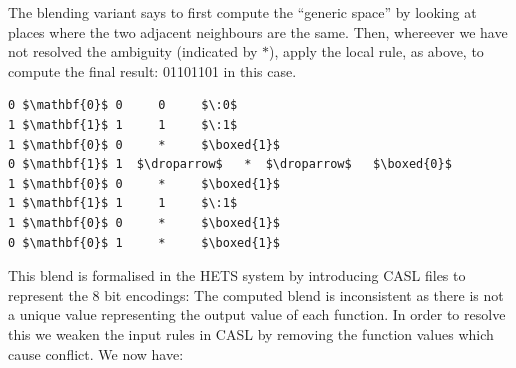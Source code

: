 \documentclass{AISB2008}
\makeatletter
\renewcommand{\boxed}[1]{\text{\fboxsep=.2em\fbox{\m@th$\displaystyle#1$}}}
\newcommand{\droparrow}{%
  \mathchoice{\raisebox{-4pt}{$\displaystyle\mapsto$}}
             {\raisebox{-4pt}{$\mapsto$}}
             {\raisebox{-2pt}{$\scriptstyle\mapsto$}}
             {\raisebox{-2pt}{$\scriptscriptstyle\mapsto$}}}
\makeatother
\begin{document}

The blending variant says to first compute the ``generic space'' by looking at places where the two adjacent neighbours are the same. Then, whereever we have not resolved the ambiguity (indicated by $\ast$), apply the local rule, as above, to compute the final result: 01101101 in this case.

\lstset{
  xleftmargin=.3\columnwidth, xrightmargin=.3\columnwidth
}

\begin{lstlisting}[mathescape]
0 $\mathbf{0}$ 0     0     $\:0$
1 $\mathbf{1}$ 1     1     $\:1$
1 $\mathbf{0}$ 0     *     $\boxed{1}$
0 $\mathbf{1}$ 1  $\droparrow$   *  $\droparrow$   $\boxed{0}$
1 $\mathbf{0}$ 0     *     $\boxed{1}$
1 $\mathbf{1}$ 1     1     $\:1$
1 $\mathbf{0}$ 0     *     $\boxed{1}$
0 $\mathbf{0}$ 1     *     $\boxed{1}$
\end{lstlisting}

This blend is formalised in the HETS system \cite{} by introducing CASL files to represent the 8 bit encodings:
The computed blend is inconsistent as there is not a unique value representing the output value of each function. In order to resolve this we weaken the input rules in CASL by removing the function values which cause conflict. We now have:
\end{document}
